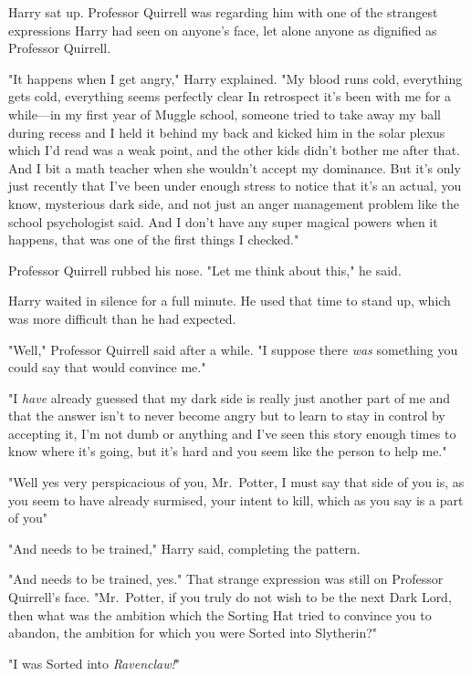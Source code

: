 Harry sat up. Professor Quirrell was regarding him with one of the strangest
expressions Harry had seen on anyone's face, let alone anyone as dignified as
Professor Quirrell.

"It happens when I get angry," Harry explained. "My blood runs cold, everything
gets cold, everything seems perfectly clear{\el} In retrospect it's been
with me for a while—in my first year of Muggle school, someone tried to take
away my ball during recess and I held it behind my back and kicked him in the
solar plexus which I'd read was a weak point, and the other kids didn't bother
me after that. And I bit a math teacher when she wouldn't accept my dominance.
But it's only just recently that I've been under enough stress to notice that
it's an actual, you know, mysterious dark side, and not just an anger
management problem like the school psychologist said. And I don't have any
super magical powers when it happens, that was one of the first things I
checked."

Professor Quirrell rubbed his nose. "Let me think about this," he said.

Harry waited in silence for a full minute. He used that time to stand up, which
was more difficult than he had expected.

"Well," Professor Quirrell said after a while. "I suppose there \emph{was}
something you could say that would convince me."

"I \emph{have} already guessed that my dark side is really just another part of
me and that the answer isn't to never become angry but to learn to stay in
control by accepting it, I'm not dumb or anything and I've seen this story
enough times to know where it's going, but it's hard and you seem like the
person to help me."

"Well{\el} yes{\el} very perspicacious of you, Mr.~Potter, I must
say{\el} that side of you is, as you seem to have already surmised, your
intent to kill, which as you say is a part of you{\el}"

"And needs to be trained," Harry said, completing the pattern.

"And needs to be trained, yes." That strange expression was still on Professor
Quirrell's face. "Mr.~Potter, if you truly do not wish to be the next Dark
Lord, then what was the ambition which the Sorting Hat tried to convince you to
abandon, the ambition for which you were Sorted into Slytherin?"

"I was Sorted into \emph{Ravenclaw!}"

